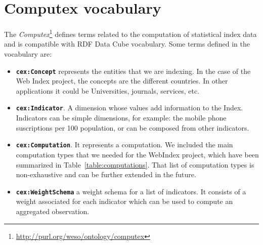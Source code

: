 \documentclass{llncs}
\begin{document}
\section{Computex vocabulary}

The \emph{Computex}\footnote{\url{http://purl.org/weso/ontology/computex}} defines terms related to the
computation of statistical index data and is compatible with RDF Data Cube
vocabulary. Some terms defined in the vocabulary are:

\begin{itemize}
\item\textbf{\lstinline|cex:Concept|} represents the entities that we are
indexing.
In the case of the Web Index project, the concepts are the different countries.
In other applications it could be Universities, journals, services, etc.

\item\textbf{\lstinline|cex:Indicator|}. A dimension whose values add
information to the Index.
Indicators can be simple dimensions, for example: the mobile phone
suscriptions per 100 population, or can be composed from other
indicators. 

\item\textbf{\lstinline|cex:Computation|}. It represents a computation. We included the main computation types that we needed for the WebIndex project, which have been summarized in
Table~\ref{table:computations}. That list of computation types is non-exhaustive
and can be further extended in the future. 

\item\textbf{\lstinline|cex:WeightSchema|} a weight schema for a list of
indicators. It consists of a weight associated for each indicator which can be
used to compute an aggregated observation.

\end{itemize}
\end{document}
